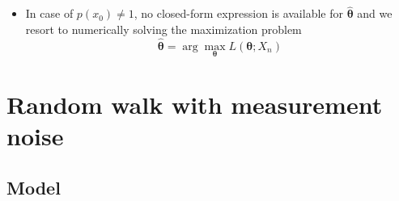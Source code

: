 \documentclass[12pt,a4paper]{article}
\begin{document}
\begin{itemize}
\begin{itemize}
\begin{figure}[t]
    {figures/fig_ar1.pdf}
    \caption{%
      Sample paths $X_{n}$ generated from \eqref{eq:model_ar1} where $x_{0}=0$, $a=0.5$, $b=1$, $V=3$ (top left)
      and the maximum likelihood estimator $\hat{\theta}(X_{n})=(\hat{a}(X_{n}), \hat{b}(X_{n}), \hat{V}(X_{n}))$ computed as \eqref{eq:MLE_ar1}. 
    } 
    \label{fig:ar1}
  \end{figure} 

  \item In case of $p(x_{0})\neq 1$,
    no closed-form expression is available for $\hat{\bm{\theta}}$
    and we resort to numerically solving the maximization problem
    \begin{equation}\nonumber%
      \hat{\bm{\theta}} = \arg\max_{\bm{\theta}} L(\bm{\theta};X_{n})
    \end{equation}

  \end{itemize}

\end{itemize}

\section{Random walk with measurement noise}

\subsection{Model}
\end{document}
